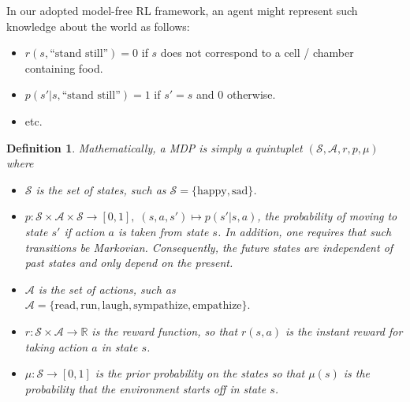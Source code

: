 \documentclass[10pt,letterpaper]{article}
\newtheorem*{definition*}{Definition}
\begin{document}
In our adopted model-free RL framework,
an agent might represent such knowledge about the world as follows:
\begin{itemize}
\item $r(s, \text{``stand still''}) = 0$ if $s$ does not correspond to a cell / chamber containing food.
\item $p(s'|s,\text{``stand still''}) = 1$ if $s'=s$ and $0$ otherwise.
\item etc.
\end{itemize}

\begin{definition*}
Mathematically, a MDP is simply a quintuplet $(\mathcal S, \mathcal A, r, p, \mu)$ where
\begin{itemize}
\item $\mathcal S$ is the set of states, such as $\mathcal S = \{\text{happy}, \text{sad}\}$.
\item $p : \mathcal S \times \mathcal A \times \mathcal S \rightarrow [0, 1],\; (s,a,s') \mapsto p(s'|s,a)$,
  the probability of moving to state $s'$ if action $a$ is taken from state $s$. In addition, one requires that such
  transitions be Markovian. Consequently, the future states are independent of past states and only depend on the present.
\item $\mathcal A$ is the set of actions, such as $\mathcal A = \{\text{read}, \text{run},
  \text{laugh}, \text{sympathize}, \text{empathize}\}.$
\item $r : \mathcal S \times \mathcal A \rightarrow \mathbb R$ is the \textit{reward function},
  so that $r(s, a)$ is the instant reward for taking action $a$ in state $s$.
\item $\mu: \mathcal S \rightarrow [0, 1]$ is the prior probability on the states so that
  $\mu(s)$ is the probability that the environment starts off in state $s$.
\end{itemize}

\end{definition*}
\end{document}
